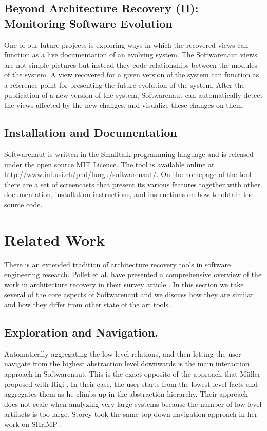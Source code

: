 \documentclass[preprint,12pt]{elsarticle}
\begin{document}
\subsection {Beyond Architecture Recovery (II): Monitoring Software Evolution}

One of our future projects is exploring ways in which the recovered views can function as a live documentation of an evolving system. The Softwarenaut views are not simple pictures but instead they code relationships between the modules of the system. A view recovered for a given version of the system can function as a reference point for presenting the future evolution of the system. After the publication of a new version of the system, Softwarenaut can automatically detect the views affected by the new changes, and visualize these changes on them.


\subsection {Installation and Documentation}
Softwarenaut is written in the Smalltalk programming language and is released under the open source MIT Licence. The tool is available online at {\footnotesize \url{http://www.inf.usi.ch/phd/lungu/softwarenaut/}}. On the homepage of the tool there are a set of screencasts that present its various features together with other documentation, installation instructions, and instructions on how to obtain the source code. 


\newpage
\section {Related Work}
\label {sec:rel}

There is an extended tradition of architecture recovery tools in software engineering research. Pollet et al. have presented a comprehensive overview of the work in architecture recovery in their survey article \cite{pollet-sar}. In this section we take several of the core aspects of Softwarenaut and we discuss how they are similar and how they differ from other state of the art tools.

\subsection {Exploration and Navigation.} Automatically aggregating the low-level relations, and then letting the user navigate from the highest abstraction level downwards is the main interaction approach in Softwarenaut. This is the exact opposite of the approach that M{\"u}ller proposed with Rigi \cite{muller-revengenv}. In their case, the user starts from the lowest-level facts and aggregates them as he climbs up in the abstraction hierarchy. Their approach does not scale when analyzing very large systems because the number of low-level artifacts is too large. Storey took the same top-down navigation approach in her work on SHriMP \cite{storey-shrimp}.
\end{document}
